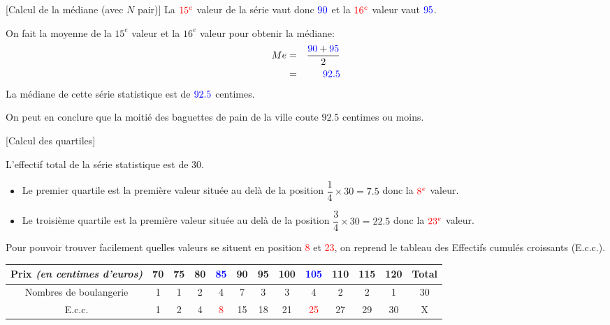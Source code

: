 \documentclass[10pt,a4paper,openany,twoside, eleve]{book}
\begin{document}
\begin{ex}{}{}
\begin{methode}{}{}[Calcul de la médiane (avec $N$ pair)]
\noindent La $\textcolor{red}{15^{e}}$ valeur de la série vaut donc $\textcolor{blue}{90}$ et la $\textcolor{red}{16^{e}}$ valeur vaut $\textcolor{blue}{95}$.

\noindent On fait la moyenne de la $15^{e}$ valeur et la $16^{e}$ valeur pour obtenir la médiane:
\begin{eqnarray*}
Me &=& \frac{\textcolor{blue}{90}+\textcolor{blue}{95}}{2}\\
&=& \textcolor{blue}{92.5}
\end{eqnarray*}
\noindent La médiane de cette série statistique est de $\textcolor{blue}{92.5}$ centimes.

\noindent On peut en conclure que la moitié des baguettes de pain de la ville coute $92.5$ centimes ou moins.
\end{methode}

\begin{methode}{}{}[Calcul des quartiles]

L'effectif total de la série statistique est de $30$.
\begin{itemize}
\item[-]Le premier quartile est la première valeur située au delà de la position $ \dfrac{1}{4} \times 30 = 7.5 $ donc la $\textcolor{red}{8^{e}}$ valeur.
\item[-]Le troisième quartile est la première valeur située au delà de la position $ \dfrac{3}{4} \times 30 = 22.5 $ donc la $\textcolor{red}{23^{e}}$ valeur.
\end{itemize}
Pour pouvoir trouver facilement quelles valeurs se situent en position \textcolor{red}{8} et \textcolor{red}{23}, on reprend le tableau des Effectifs cumulés croissants (E.c.c.).
\end{methode}

\begin{center}
\renewcommand{\arraystretch}{1.8}
\begin{tabular}{|c|c|c|c|c|c|c|c|c|c|c|c|c|}
\hline
Prix \textit{(en centimes d'euros)} & 70 & 75 & 80 & \textcolor{blue}{85} & 90 & 95 & 100 & \textcolor{blue}{105} & 110 & 115 & 120 & Total \\
\hline
Nombres de boulangerie & 1 & 1 & 2 & 4 & 7 & 3 & 3 & 4 & 2 & 2 & 1 & 30 \\
\hline
E.c.c. & 1 & 2 & 4 & \textcolor{red}{8} & 15 & 18 & 21 & \textcolor{red}{25} & 27 & 29 & 30 & X \\
\hline
\end{tabular}
\end{center}


\end{ex}
\end{document}
